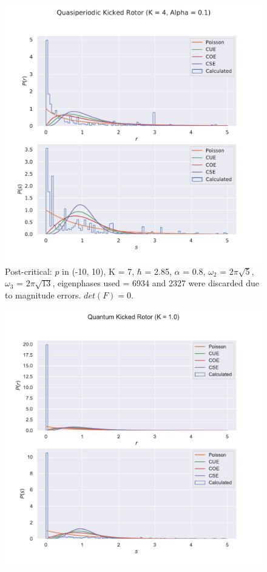 \documentclass[12pt]{article}
\begin{document}
\begin{figure}[h]
    \includegraphics[width=\linewidth]{quasiperiodic_kickedrotor_spectrum_N10_precritical.pdf}
    \caption{Post-critical: $p$ in (-10, 10), K = 7, $\hbar$ = 2.85, $\alpha$ = 0.8,
    $\omega_2$ = $2\pi\sqrt{5}$, $\omega_3$ = $2\pi\sqrt{13}$, eigenphases
    used = 6934 and 2327 were discarded due to magnitude errors. $det(F) = 0$.}
    \centering
\end{figure}

\begin{figure}
    \centering
    \includegraphics[width=\linewidth]{kickedrotor_spectrum_K1.0.pdf}
\end{figure}
\end{document}
